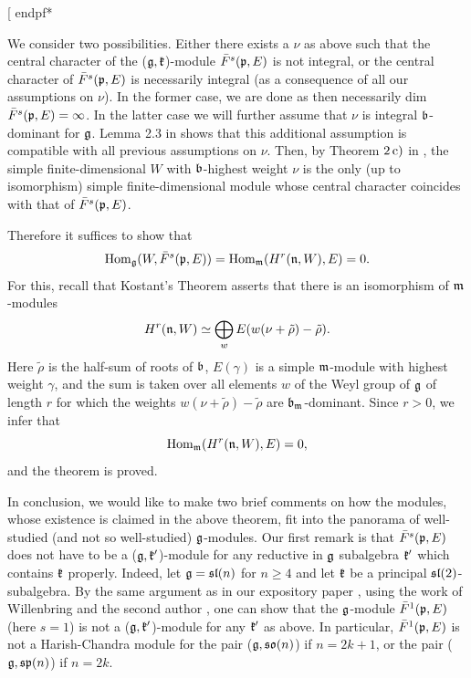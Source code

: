 \documentclass[12pt]{amsart}
\makeatletter
\def\mathfrak{\frak}
\newenvironment{proof}{%
         \@ifnextchar[{%
                       \expandafter\let\expandafter\end@proof
                         \csname endpf*\endcsname
                         \my@proof
                      }{\let\end@proof\endpf\pf}%
        }{\end@proof}
\def\my@proof[#1]{\@nameuse{pf*}{#1}}
\def\@putname#1#2#3#4{\def\@@ref{#3}\let\old@bf\bf
        \def\bf##1{\old@bf\if?\noexpand##1?{#4}\else##1\fi}%
        #1{#2}%
        \let\bf\old@bf}
\def\@putname#1#2#3#4{\def\@@ref{#3}\let\old@bf\bf    %
        \let\old@reset@font\reset@font                  %
        \def\bf##1{\old@bf\if?\noexpand##1?{#4}\else##1\fi}%
        \def\reset@font##1##2{\old@reset@font##1\if?\noexpand##2?{#4}\else##2\fi}#1{#2}%
        \let\bf\old@bf\let\reset@font\old@reset@font}
\let\my@cite=\cite
\def\cite#1{\@putname\my@cite{#1}{\@citeb}{\tiny\rm\@@ref}}
\theoremstyle{plain} %
\numberwithin{equation}{section}
\theoremstyle{definition}
\theoremstyle{remark}
\theoremstyle{plain} %
\newcommand{\fg}{\mathfrak{g}}
\newcommand{\fk}{\mathfrak{k}}
\newcommand{\fn}{\mathfrak{n}}
\newcommand{\fb}{\mathfrak{b}}
\newcommand{\fm}{\mathfrak{m}}
\makeatother
\begin{document}
\begin{proof}
We consider two possibilities. Either there exists a $\nu$ as above such that the central character of the ($\fg,\fk$)-module $\bar{F}^s(\mathfrak{p},E)$ is not integral, or the central character of $\bar{F}^s(\mathfrak{p},E)$  is necessarily integral (as a consequence of all our assumptions on $\nu$). In the former case, we are done as then necessarily dim$\bar{F}^s(\mathfrak{p},E)=\infty$. In the latter case we will further assume that $\nu$ is integral $\fb$-dominant for $\fg$. Lemma 2.3 in \cite{PZ3} shows that this additional assumption is compatible with all previous  assumptions on $\nu$. Then, by Theorem $2\,\textup{c})$ in \cite{PZ1},  the simple finite-dimensional $W$ with $\fb$-highest weight $\nu$ is the only (up to isomorphism) simple finite-dimensional module whose central character coincides with that of $\bar{F}^s(\mathfrak{p},E)$.


Therefore it suffices to show that
$$\textup{Hom}_\fg(W,\bar{F}^s(\mathfrak{p},E))=\textup{Hom}_{\mathfrak{m}}(H^r(\fn,W),E)=0.$$
  For this, recall that Kostant's Theorem \cite{K} asserts that there is an  isomorphism of $\fm$-modules
$$H^r(\fn,W)\simeq\bigoplus_w E(w(\nu+\tilde\rho)-\tilde\rho).$$
Here $\tilde\rho$ is the half-sum of roots of $\fb$, $E(\gamma)$ is a simple $\fm$-module with highest weight $\gamma$, and the sum is taken over all elements $w$ of the Weyl group of $\fg$ of length $r$ for which the weights $w(\nu+\tilde\rho)-\tilde\rho$ are $\fb_{\fm}$-dominant. Since $r>0$, we infer that 
$$\textup{Hom}_{\mathfrak{m}}(H^r(\fn,W),E)=0,$$
and the theorem is proved.
\end{proof}

In conclusion, we would like to make two brief comments on how the modules, whose existence is claimed in the above theorem, fit into the panorama of well-studied (and not so well-studied) $\fg$-modules. Our first remark is that  $\bar{F}^s(\mathfrak{p},E)$ does not have to be a ($\fg,\fk'$)-module for any reductive in $\fg$ subalgebra $\fk'$ which contains $\fk$ properly. Indeed, let $\fg=\mathfrak{sl}(n)$ for $n\geq4$ and let $\fk$ be a principal $\mathfrak{sl}(2)$-subalgebra. By the same argument as in our expository paper \cite{PZ0}, using  the work of Willenbring and the second author \cite{WZ}, one can show that the $\fg$-module $\bar{F}^1(\mathfrak{p},E)$ (here $s=1$) is not a ($\fg,\fk'$)-module for any $\fk'$ as above. In particular, $\bar{F}^1(\mathfrak{p},E)$ is not a Harish-Chandra module for the pair ($\fg,\mathfrak{so}(n)$) if $n=2k+1$, or the pair ($\fg,\mathfrak{sp}(n)$) if $n=2k$.
\end{document}
